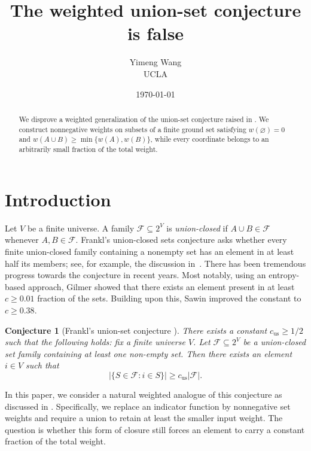 \documentclass[11pt]{article}
\newtheorem{conjecture}[conjecture]{Conjecture}
\newcommand{\<}{\langle}
\renewcommand{\>}{\rangle}
\newcommand{\calF}{\mathcal{F}}
\newcommand{\F}{\mathcal{F}}
\numberwithin{equation}{section}
\begin{document}
\title{The weighted union-set conjecture is false}
\author{Yimeng Wang \\ UCLA}

\maketitle

\date{\today}

\begin{abstract}
We disprove a weighted generalization of the union-set conjecture \cite{frankl1995extremal} raised in \cite{Gowers1}. We construct nonnegative weights on subsets of a finite ground set satisfying
$w(\varnothing)=0$ and $w(A\cup B)\ge\min\{w(A),w(B)\}$, while every
coordinate belongs to an arbitrarily small fraction of the total weight. 
\end{abstract}

\section{Introduction}\label{sec:intro}
Let $V$ be a finite universe. A family $\F\subseteq2^V$ is \emph{union-closed} if $A\cup B\in\F$ whenever
$A,B\in\F$. Frankl's union-closed sets conjecture asks whether every finite
union-closed family containing a nonempty set has an element in at least half
its members; see, for example, the discussion in~\cite{Gowers1,EIL}. There has been tremendous progress towards the conjecture in recent years. Most notably, using an entropy-based approach, Gilmer \cite{Gilmer2022} showed that there exists an element present in at least $c \geq 0.01$ fraction of the sets. Building upon this, Sawin \cite{Sawin2023} improved the constant to $c \geq 0.38$.

\begin{conjecture}[Frankl's union-set conjecture \cite{frankl1995extremal}]\label{conj:frankl}
    There exists a constant $c_{\mathrm{us}} \geq 1/2$ such that the following holds: fix a finite universe $V$. Let $\calF \subseteq 2^{V}$ be a union-closed set family containing at least one non-empty set. Then there exists an element $i \in V$ such that 
    \[
    |\{S \in \calF: i \in S\}| \geq c_{\mathrm{us}} |\calF|.
    \]
\end{conjecture}

In this paper, we consider a natural weighted analogue of this conjecture as discussed in \cite{Gowers1}. Specifically, we replace an indicator function by nonnegative
set weights and require a union to retain at least the smaller input weight.
The question is whether this form of closure still forces an element
to carry a constant fraction of the total weight.
\end{document}
